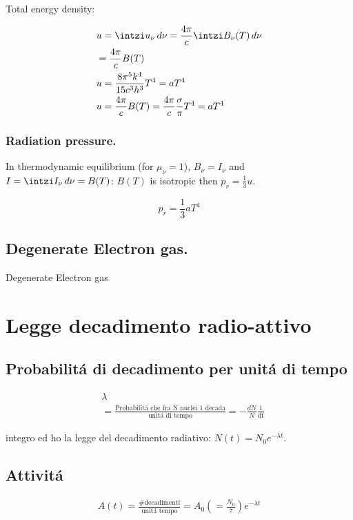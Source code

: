 Total energy density:

\begin{align*}
&u=\intzi u_{\nu}\,d\nu=\frac{4\pi}{c}\intzi B_{\nu}(T)\,d\nu\\
&=\frac{4\pi}{c}B(T)\\
&u=\frac{8\pi^5k^4}{15c^3h^3}T^4=aT^4\\
&u=\frac{4\pi}{c}B(T)=\frac{4\pi}{c}\frac{\sigma}{\pi}T^4=aT^4
\end{align*}

\subsection{Radiation pressure.}

In thermodynamic equilibrium (for $\mu_{\nu}=1$), $B_{\nu}=I_{\nu}$ and $I=\intzi I_{\nu}\,d\nu=B(T)$: $B(T)$ is isotropic then $p_r=\frac{1}{3}u$.

\begin{equation*}
p_r=\frac{1}{3}aT^4
\end{equation*}


\section{Degenerate Electron gas.}

\begin{todo}{Degenerate Electron gas}
\end{todo}

\chapter{Legge decadimento radio-attivo}
\PartialToc



\section{Probabilit\'a di decadimento per unit\'a di tempo}
\begin{align*}
&\lambda\\
&=\frac{\text{Probabilit\'a che fra N nuclei 1 decada}}{\text{unit\'a di tempo}}=-\frac{dN}{N}\frac{1}{\text{dt}}
\end{align*}

integro ed ho la legge del decadimento radiativo:
$N(t)=N_0e^{-\lambda t}$.

\section{Attivit\'a}
\begin{align*}
A(t)=\frac{\text{\# decadimenti}}{\text{unit\'a tempo}}=A_0(=\frac{N_0}{\tau})e^{-\lambda t}
\end{align*}


